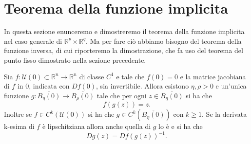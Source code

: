\section{Teorema della funzione implicita}
In questa sezione enunceremo e dimostreremo il teorema della funzione implicita nel caso generale di $\mathbb{R}^{p}\times\mathbb{R}^{q}$. Ma per fare ciò abbiamo bisogno del teorema della funzione inversa, di cui riporteremo la dimostrazione, che fa uso del teorema del punto fisso dimostrato nella sezione precedente.
\begin{teorema}
Sia $f:\mathcal{U}(0) \subset \mathbb{R}^{n} \rightarrow \mathbb{R}^{n}$ di classe $C^{1}$ e tale che $f(0)=0$ e la matrice jacobiana di $f$ in 0, indicata con $Df(0)$, sia invertibile. Allora esistono $\eta, \rho > 0$ e un'unica funzione $g:\overline{B_{\eta}(0)}\rightarrow\overline{B_{\rho}(0)}$ tale che per ogni $z \in \overline{B_{\eta}(0)}$ si ha che 
\begin{equation}\label{1.10}
f(g(z))=z.
\end{equation}
Inoltre se $f \in C^{k}\left(\mathcal{U}(0)\right)$ si ha che $g\in C^{k}\left(\overline{B_{\eta}(0)}\right)$ con $k\geq 1$. Se la derivata k-esima di $f$ è lipschitziana allora anche quella di $g$ lo è e si ha che
\begin{equation}\label{1.11}
Dg(z)=Df(g(z))^{-1}.
\end{equation}
\end{teorema}
